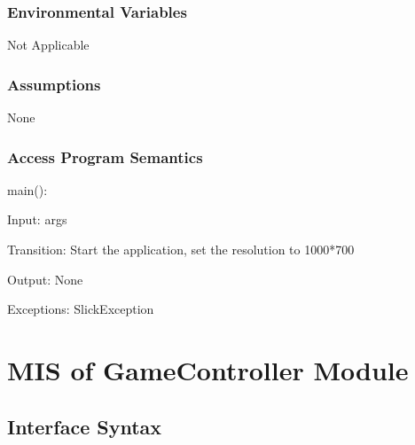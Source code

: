 \documentclass[12,english]{article}
\begin{document}
		\subsubsection{Environmental Variables}
		Not Applicable
		
		\subsubsection{Assumptions}
		None
		
		\subsubsection{Access Program Semantics}
		main():
		
		Input: args
		
		Transition: Start the application, set the resolution to 1000*700
		
		Output: None
		
		Exceptions: SlickException
	
	
	
\section{MIS of GameController Module}
		\subsection{Interface Syntax}
\end{document}
